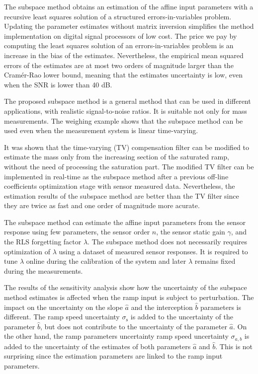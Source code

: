 The subspace method obtains an estimation of the affine input parameters with a recursive least squares solution of a structured errors-in-variables problem.
Updating the parameter estimates without matrix inversion simplifies the method implementation on digital signal processors of low cost.
The price we pay by computing the least squares solution of an errors-in-variables problem is an increase in the bias of the estimates.
Nevertheless, the empirical mean squared errors of the estimates are at most two orders of magnitude larger than the Cram\'er-Rao lower bound, meaning that the estimates uncertainty is low, even when the SNR is lower than 40 dB.


The proposed subspace method is a general method that can be used in different applications, with realistic signal-to-noise ratios. 
It is suitable not only for mass measurements.
The weighing example shows that the subspace method can be used even when the measurement system is linear time-varying.

It was shown that the time-varying (TV) compensation filter can be modified to estimate the mass only from the increasing section of the saturated ramp, without the need of processing the saturation part.
The modified TV filter can be implemented in real-time as the subspace method after a previous off-line coefficients optimization stage with sensor measured data.
Nevertheless, the estimation results of the subspace method are better than the TV filter since they are twice as fast and one order of magnitude more acurate.

The subspace method can estimate the affine input parameters from the sensor response using few parameters, the sensor order $n$, the sensor static gain $\gamma$, and the RLS forgetting factor $\lambda$.
The subspace method does not necessarily requires optimization of $\lambda$ using a dataset of measured sensor responses.
It is required to tune $\lambda$ online during the calibration of the system and later $\lambda$ remains fixed during the measurements.

The results of the sensitivity analysis show how the uncertainty of the subspace method estimates is affected when the ramp input is subject to perturbation.
The impact on the uncertainty on the slope $\widehat{a}$ and the interception $\widehat{b}$ parameters is different.
The ramp speed uncertainty $\sigma_{\mathrm{s}}$ is added to the uncertainty of the parameter $\widehat{b}$, but does not contribute to the uncertainty of the parameter $\widehat{a}$.
On the other hand, the ramp parameters uncertainty ramp speed uncertainty $\sigma_{a,b}$ is added to the uncertainty of the estimates of both parameters $\widehat{a}$ and $\widehat{b}$.
This is not surprising since the estimation parameters are linked to the ramp input parameters.


